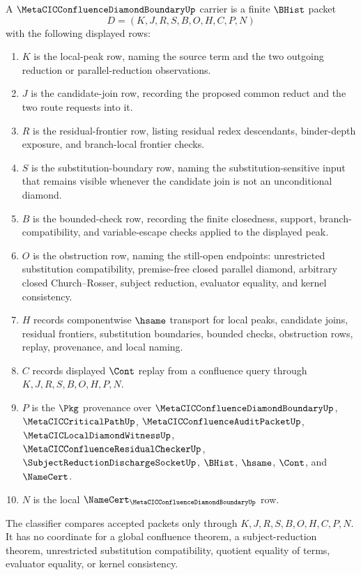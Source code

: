 \begin{definition}
\label{def:metacic-confluence-diamond-boundary-carrier}
A $\MetaCICConfluenceDiamondBoundaryUp$ carrier is a finite $\BHist$ packet
$$
D=(K,J,R,S,B,O,H,C,P,N)
$$
with the following displayed rows:
\begin{enumerate}
\item $K$ is the local-peak row, naming the source term and the two outgoing reduction or parallel-reduction observations.
\item $J$ is the candidate-join row, recording the proposed common reduct and the two route requests into it.
\item $R$ is the residual-frontier row, listing residual redex descendants, binder-depth exposure, and branch-local frontier checks.
\item $S$ is the substitution-boundary row, naming the substitution-sensitive input that remains visible whenever the candidate join is not an unconditional diamond.
\item $B$ is the bounded-check row, recording the finite closedness, support, branch-compatibility, and variable-escape checks applied to the displayed peak.
\item $O$ is the obstruction row, naming the still-open endpoints: unrestricted substitution compatibility, premise-free closed parallel diamond, arbitrary closed Church--Rosser, subject reduction, evaluator equality, and kernel consistency.
\item $H$ records componentwise $\hsame$ transport for local peaks, candidate joins, residual frontiers, substitution boundaries, bounded checks, obstruction rows, replay, provenance, and local naming.
\item $C$ records displayed $\Cont$ replay from a confluence query through $K,J,R,S,B,O,H,P,N$.
\item $P$ is the $\Pkg$ provenance over $\MetaCICConfluenceDiamondBoundaryUp$, $\MetaCICCriticalPathUp$, $\MetaCICConfluenceAuditPacketUp$, $\MetaCICLocalDiamondWitnessUp$, $\MetaCICConfluenceResidualCheckerUp$, $\SubjectReductionDischargeSocketUp$, $\BHist$, $\hsame$, $\Cont$, and $\NameCert$.
\item $N$ is the local $\NameCert_{\MetaCICConfluenceDiamondBoundaryUp}$ row.
\end{enumerate}
The classifier compares accepted packets only through $K,J,R,S,B,O,H,C,P,N$. It has no coordinate for a global confluence theorem, a subject-reduction theorem, unrestricted substitution compatibility, quotient equality of terms, evaluator equality, or kernel consistency.
\end{definition}

